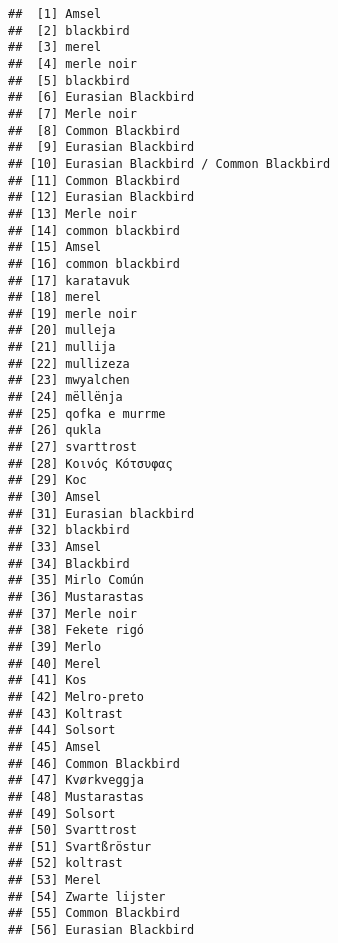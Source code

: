 \documentclass[]{article}
\begin{document}
\begin{verbatim}
##  [1] Amsel                                
##  [2] blackbird                            
##  [3] merel                                
##  [4] merle noir                           
##  [5] blackbird                            
##  [6] Eurasian Blackbird                   
##  [7] Merle noir                           
##  [8] Common Blackbird                     
##  [9] Eurasian Blackbird                   
## [10] Eurasian Blackbird / Common Blackbird
## [11] Common Blackbird                     
## [12] Eurasian Blackbird                   
## [13] Merle noir                           
## [14] common blackbird                     
## [15] Amsel                                
## [16] common blackbird                     
## [17] karatavuk                            
## [18] merel                                
## [19] merle noir                           
## [20] mulleja                              
## [21] mullija                              
## [22] mullizeza                            
## [23] mwyalchen                            
## [24] mëllënja                             
## [25] qofka e murrme                       
## [26] qukla                                
## [27] svarttrost                           
## [28] Κοινός Κότσυφας                      
## [29] Кос                                  
## [30] Amsel                                
## [31] Eurasian blackbird                   
## [32] blackbird                            
## [33] Amsel                                
## [34] Blackbird                            
## [35] Mirlo Común                          
## [36] Mustarastas                          
## [37] Merle noir                           
## [38] Fekete rigó                          
## [39] Merlo                                
## [40] Merel                                
## [41] Kos                                  
## [42] Melro-preto                          
## [43] Koltrast                             
## [44] Solsort                              
## [45] Amsel                                
## [46] Common Blackbird                     
## [47] Kvørkveggja                          
## [48] Mustarastas                          
## [49] Solsort                              
## [50] Svarttrost                           
## [51] Svartßröstur                         
## [52] koltrast                             
## [53] Merel                                
## [54] Zwarte lijster                       
## [55] Common Blackbird                     
## [56] Eurasian Blackbird                   

\end{verbatim}
\end{document}
